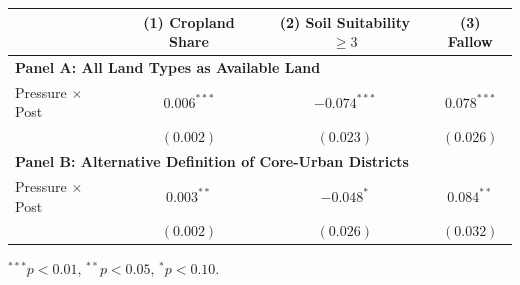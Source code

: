 \begin{tabular}{lccc}
\toprule
 & (1) Cropland Share & (2) Soil Suitability $\ge 3$ & (3) Fallow \\ 
\midrule
\multicolumn{4}{l}{\textbf{Panel A: All Land Types as Available Land}} \\
Pressure $\times$ Post 
  & $0.006^{***}$ & $-0.074^{***}$ & $0.078^{***}$ \\
  & $(0.002)$ & $(0.023)$ & $(0.026)$ \\[0.6em]

\multicolumn{4}{l}{\textbf{Panel B: Alternative Definition of Core-Urban Districts}} \\
Pressure $\times$ Post 
  & $0.003^{**}$ & $-0.048^{*}$ & $0.084^{**}$ \\
  & $(0.002)$ & $(0.026)$ & $(0.032)$ \\

\bottomrule
\end{tabular}

\vspace{0.5em}
{\footnotesize
$^{***} p<0.01$,
$^{**} p<0.05$,
$^{*} p<0.10$.
\par}
